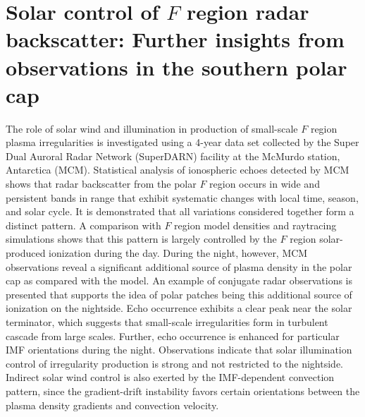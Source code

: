 







%


\chapter{Solar control of \(F\) region radar backscatter: Further insights from observations in the southern polar cap}







The role of solar wind and illumination in production of small-scale \(F\) region plasma irregularities is investigated using a 4-year data set collected by the Super Dual Auroral Radar Network (SuperDARN) facility at the McMurdo station, Antarctica (MCM). Statistical analysis of ionospheric echoes detected by MCM shows that radar backscatter from the polar \(F\) region occurs in wide and persistent bands in range that exhibit systematic changes with local time, season, and solar cycle. It is demonstrated that all variations considered together form a distinct pattern. A comparison with \(F\) region model densities and raytracing simulations shows that this pattern is largely controlled by the \(F\) region solar-produced ionization during the day. During the night, however, MCM observations reveal a significant additional source of plasma density in the polar cap as compared with the model. An example of conjugate radar observations is presented that supports the idea of polar patches being this additional source of ionization on the nightside. Echo occurrence exhibits a clear peak near the solar terminator, which suggests that small-scale irregularities form in turbulent cascade from large scales. Further, echo occurrence is enhanced for particular IMF orientations during the night. Observations indicate that solar illumination control of irregularity production is strong and not restricted to the nightside. Indirect solar wind control is also exerted by the IMF-dependent convection pattern, since the gradient-drift instability favors certain orientations between the plasma density gradients and convection velocity.

